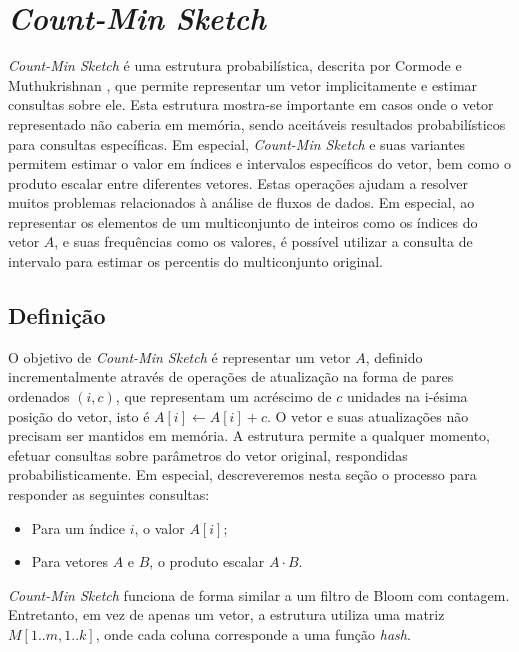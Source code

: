 \section{\emph{Count-Min Sketch}}\label{sec:countmin}

\emph{Count-Min Sketch} é uma estrutura probabilística, descrita por Cormode e Muthukrishnan \cite{cormode2005improved}, que permite representar um vetor implicitamente e estimar consultas sobre ele. Esta estrutura mostra-se importante em casos onde o vetor representado não caberia em memória, sendo aceitáveis resultados probabilísticos para consultas específicas. Em especial, \emph{Count-Min Sketch} e suas variantes permitem estimar o valor em índices e intervalos específicos do vetor, bem como o produto escalar entre diferentes vetores. Estas operações ajudam a resolver muitos problemas relacionados à análise de fluxos de dados. Em especial, ao representar os elementos de um multiconjunto de inteiros como os índices do vetor $A$, e suas frequências como os valores, é possível utilizar a consulta de intervalo para estimar os percentis do multiconjunto original.

\subsection{Definição}


O objetivo de \emph{Count-Min Sketch} é representar um vetor $A$,  definido incrementalmente através de operações de atualização na forma de pares ordenados $(i, c)$, que representam um acréscimo de $c$ unidades na i-ésima posição do vetor, isto é $A[i] \gets A[i] + c$. O vetor e suas atualizações não precisam ser mantidos em memória. A estrutura permite a qualquer momento, efetuar consultas sobre parâmetros do vetor original, respondidas probabilisticamente. Em especial, descreveremos nesta seção o processo para responder as seguintes consultas:

\begin{itemize}
  \item Para um índice $i$, o valor $A[i]$;
  \item Para vetores $A$ e $B$, o produto escalar $A \cdot B$.
\end{itemize}

\emph{Count-Min Sketch} funciona de forma similar a um filtro de Bloom com contagem. Entretanto, em vez de apenas um vetor, a estrutura utiliza uma matriz $M[1..m, 1..k]$, onde cada coluna corresponde a uma função \emph{hash}.

